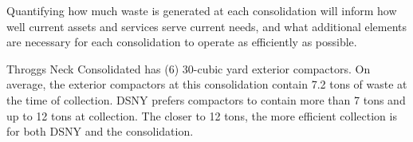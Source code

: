 
    Quantifying how much waste is generated at each consolidation will inform how well current assets and services serve current needs, and what additional elements are necessary for each consolidation to operate as efficiently as possible.
    
    Throggs Neck Consolidated has (6) 30-cubic yard exterior compactors. On average, the exterior compactors at this consolidation contain 7.2 tons of waste at the time of collection. DSNY prefers compactors to contain more than 7 tons and up to 12 tons at collection. The closer to 12 tons, the more efficient collection is for both DSNY and the consolidation.